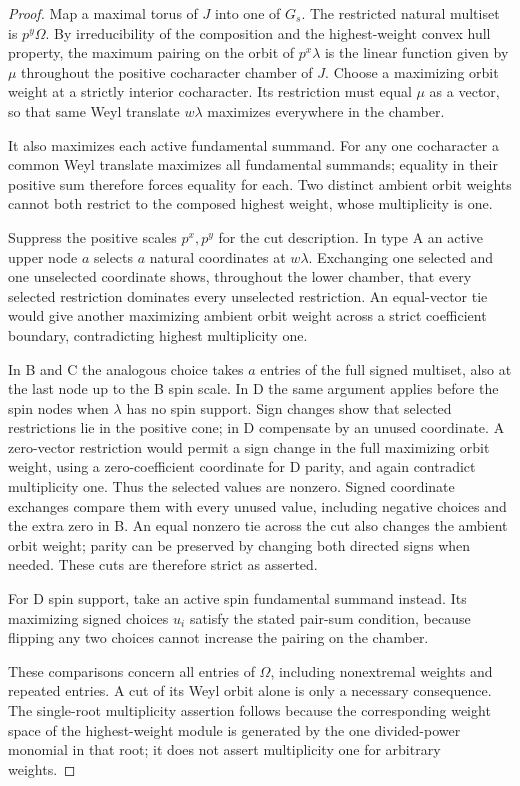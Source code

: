 \begin{proof}
Map a maximal torus of $J$ into one of $G_s$. The restricted natural
multiset is $p^y\Omega$. By irreducibility of the composition and the
highest-weight convex hull property, the maximum pairing on the orbit
of $p^x\lambda$ is the linear function given by $\mu$ throughout the
positive cocharacter chamber of $J$. Choose a maximizing orbit weight
at a strictly interior cocharacter. Its restriction must equal $\mu$
as a vector, so that same Weyl translate $w\lambda$ maximizes everywhere
in the chamber.

It also maximizes each active fundamental summand. For any one
cocharacter a common Weyl translate maximizes all fundamental summands;
equality in their positive sum therefore forces equality for each.
Two distinct ambient orbit weights cannot both restrict to the
composed highest weight, whose multiplicity is one.

Suppress the positive scales $p^x,p^y$ for the cut description. In type
A an active upper node $a$ selects $a$ natural coordinates at $w\lambda$.
Exchanging one selected and one unselected coordinate shows, throughout
the lower chamber, that every selected restriction dominates every
unselected restriction. An equal-vector tie would give another
maximizing ambient orbit weight across a strict coefficient boundary,
contradicting highest multiplicity one.

In B and C the analogous choice takes $a$ entries of the full signed
multiset, also at the last node up to the B spin scale. In D the same
argument applies before the spin nodes when $\lambda$ has no spin
support. Sign changes show that selected restrictions lie in the
positive cone; in D compensate by an unused coordinate. A zero-vector
restriction would permit a sign change in the full maximizing orbit
weight, using a zero-coefficient coordinate for D parity, and again
contradict multiplicity one. Thus the selected values are nonzero.
Signed coordinate exchanges compare them with every unused value,
including negative choices and the extra zero in B. An equal nonzero
tie across the cut also changes the ambient orbit weight; parity can
be preserved by changing both directed signs when needed. These cuts
are therefore strict as asserted.

For D spin support, take an active spin fundamental summand instead.
Its maximizing signed choices $u_i$ satisfy the stated pair-sum
condition, because flipping any two choices cannot increase the
pairing on the chamber.

These comparisons concern all entries of $\Omega$, including nonextremal weights and repeated entries. A cut of its Weyl orbit alone is only a necessary consequence. The single-root multiplicity assertion follows because the corresponding weight space of the highest-weight module is generated by the one divided-power monomial in that root; it does not assert multiplicity one for arbitrary weights.
\end{proof}


